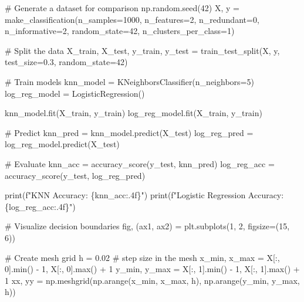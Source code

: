 \documentclass[
  letterpaper,
  DIV=11,
  numbers=noendperiod]{scrreprt}
\newenvironment{Shaded}{\begin{snugshade}}{\end{snugshade}}
\newcommand{\BuiltInTok}[1]{\textcolor[rgb]{0.00,0.23,0.31}{#1}}
\newcommand{\CommentTok}[1]{\textcolor[rgb]{0.37,0.37,0.37}{#1}}
\newcommand{\DecValTok}[1]{\textcolor[rgb]{0.68,0.00,0.00}{#1}}
\newcommand{\FloatTok}[1]{\textcolor[rgb]{0.68,0.00,0.00}{#1}}
\newcommand{\NormalTok}[1]{\textcolor[rgb]{0.00,0.23,0.31}{#1}}
\newcommand{\OperatorTok}[1]{\textcolor[rgb]{0.37,0.37,0.37}{#1}}
\newcommand{\SpecialCharTok}[1]{\textcolor[rgb]{0.37,0.37,0.37}{#1}}
\newcommand{\SpecialStringTok}[1]{\textcolor[rgb]{0.13,0.47,0.30}{#1}}
\begin{document}
\begin{Shaded}
\begin{Highlighting}[]
\CommentTok{\# Generate a dataset for comparison}
\NormalTok{np.random.seed(}\DecValTok{42}\NormalTok{)}
\NormalTok{X, y }\OperatorTok{=}\NormalTok{ make\_classification(n\_samples}\OperatorTok{=}\DecValTok{1000}\NormalTok{, n\_features}\OperatorTok{=}\DecValTok{2}\NormalTok{, n\_redundant}\OperatorTok{=}\DecValTok{0}\NormalTok{, }
\NormalTok{                           n\_informative}\OperatorTok{=}\DecValTok{2}\NormalTok{, random\_state}\OperatorTok{=}\DecValTok{42}\NormalTok{, n\_clusters\_per\_class}\OperatorTok{=}\DecValTok{1}\NormalTok{)}

\CommentTok{\# Split the data}
\NormalTok{X\_train, X\_test, y\_train, y\_test }\OperatorTok{=}\NormalTok{ train\_test\_split(X, y, test\_size}\OperatorTok{=}\FloatTok{0.3}\NormalTok{, random\_state}\OperatorTok{=}\DecValTok{42}\NormalTok{)}

\CommentTok{\# Train models}
\NormalTok{knn\_model }\OperatorTok{=}\NormalTok{ KNeighborsClassifier(n\_neighbors}\OperatorTok{=}\DecValTok{5}\NormalTok{)}
\NormalTok{log\_reg\_model }\OperatorTok{=}\NormalTok{ LogisticRegression()}

\NormalTok{knn\_model.fit(X\_train, y\_train)}
\NormalTok{log\_reg\_model.fit(X\_train, y\_train)}

\CommentTok{\# Predict}
\NormalTok{knn\_pred }\OperatorTok{=}\NormalTok{ knn\_model.predict(X\_test)}
\NormalTok{log\_reg\_pred }\OperatorTok{=}\NormalTok{ log\_reg\_model.predict(X\_test)}

\CommentTok{\# Evaluate}
\NormalTok{knn\_acc }\OperatorTok{=}\NormalTok{ accuracy\_score(y\_test, knn\_pred)}
\NormalTok{log\_reg\_acc }\OperatorTok{=}\NormalTok{ accuracy\_score(y\_test, log\_reg\_pred)}

\BuiltInTok{print}\NormalTok{(}\SpecialStringTok{f"KNN Accuracy: }\SpecialCharTok{\{}\NormalTok{knn\_acc}\SpecialCharTok{:.4f\}}\SpecialStringTok{"}\NormalTok{)}
\BuiltInTok{print}\NormalTok{(}\SpecialStringTok{f"Logistic Regression Accuracy: }\SpecialCharTok{\{}\NormalTok{log\_reg\_acc}\SpecialCharTok{:.4f\}}\SpecialStringTok{"}\NormalTok{)}

\CommentTok{\# Visualize decision boundaries}
\NormalTok{fig, (ax1, ax2) }\OperatorTok{=}\NormalTok{ plt.subplots(}\DecValTok{1}\NormalTok{, }\DecValTok{2}\NormalTok{, figsize}\OperatorTok{=}\NormalTok{(}\DecValTok{15}\NormalTok{, }\DecValTok{6}\NormalTok{))}

\CommentTok{\# Create mesh grid}
\NormalTok{h }\OperatorTok{=} \FloatTok{0.02}  \CommentTok{\# step size in the mesh}
\NormalTok{x\_min, x\_max }\OperatorTok{=}\NormalTok{ X[:, }\DecValTok{0}\NormalTok{].}\BuiltInTok{min}\NormalTok{() }\OperatorTok{{-}} \DecValTok{1}\NormalTok{, X[:, }\DecValTok{0}\NormalTok{].}\BuiltInTok{max}\NormalTok{() }\OperatorTok{+} \DecValTok{1}
\NormalTok{y\_min, y\_max }\OperatorTok{=}\NormalTok{ X[:, }\DecValTok{1}\NormalTok{].}\BuiltInTok{min}\NormalTok{() }\OperatorTok{{-}} \DecValTok{1}\NormalTok{, X[:, }\DecValTok{1}\NormalTok{].}\BuiltInTok{max}\NormalTok{() }\OperatorTok{+} \DecValTok{1}
\NormalTok{xx, yy }\OperatorTok{=}\NormalTok{ np.meshgrid(np.arange(x\_min, x\_max, h), np.arange(y\_min, y\_max, h))}


\end{Highlighting}
\end{Shaded}
\end{document}
